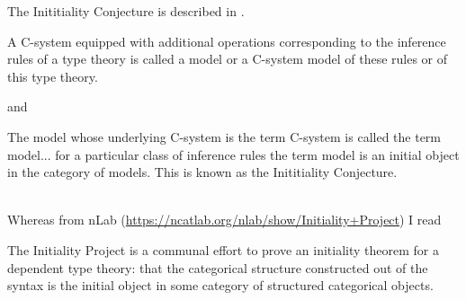 


\note The Inititiality Conjecture is described in \cite{VoevodskyInitialityConjecture}.
\begin{tightquote}
A C-system equipped with additional
operations corresponding to the inference rules of a type theory is called a
model or a C-system model of these rules or of this type theory.
\end{tightquote}
and
\begin{tightquote}
The model whose underlying
C-system is the term C-system is called the term model... for a particular
class of inference rules the term model is an initial object in the category of models.
This is known as the Inititiality Conjecture.
\end{tightquote} 
\ \\
\note Whereas from nLab (\url{https://ncatlab.org/nlab/show/Initiality+Project}) I read
\begin{tightquote}
The Initiality Project is a communal effort to prove an initiality theorem for a dependent type theory: that the categorical structure constructed out of the syntax is the initial object in some category of structured categorical objects.
\end{tightquote}

